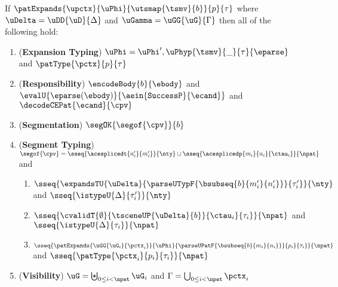 \documentclass[acmsmall]{acmart}
\begin{document}
\begin{theorem}
\label{thm:spTLM-Typing-Segmentation}
If $\patExpands{\upctx}{\uPhi}{\utsmap{\tsmv}{b}}{p}{\tau}$ where $\uDelta=\uDD{\uD}{\Delta}$ and $\uGamma=\uGG{\uG}{\Gamma}$ then all of the following hold:
\begin{enumerate}[nolistsep,leftmargin=10pt,label={\arabic*.}]
        \item (\textbf{Expansion Typing}) $\uPhi=\uPhi', \uPhyp{\tsmv}{\_}{\tau}{\eparse}$ and $\patType{\pctx}{p}{\tau}$
        \item (\textbf{Responsibility}) $\encodeBody{b}{\ebody}$ and $\evalU{\eparse(\ebody)}{\aein{\mathtt{SuccessP}}{\ecand}}$ and $\decodeCEPat{\ecand}{\cpv}$
        \item (\textbf{Segmentation}) $\segOK{\segof{\cpv}}{b}$
        \item (\textbf{Segment Typing}) $\segof{\cpv} = \sseq{\acesplicedt{n'_i}{m'_i}}{\nty} \cup \sseq{\acesplicedp{m_i}{n_i}{\ctau_i}}{\npat}$ and
          \begin{enumerate}
          \item $\sseq{
                \expandsTU{\uDelta}
                {
                  \parseUTypF{\bsubseq{b}{m'_i}{n'_i}}
                }{\tau'_i}
              }{\nty}$ and $\sseq{\istypeU{\Delta}{\tau'_i}}{\nty}$
          \item $\sseq{
            \cvalidT{\emptyset}{
              \tsceneUP
                {\uDelta}{b}
            }{
              \ctau_i
            }{\tau_i}
          }{\npat}$ and $\sseq{\istypeU{\Delta}{\tau_i}}{\npat}$
          \item $\sseq{
            \patExpands
              {\uGG{\uG_i}{\pctx_i}}
              {\uPhi}
              {\parseUPatF{\bsubseq{b}{m_i}{n_i}}}
              {p_i}
              {\tau_i}
          }{\npat}$  and $\sseq{\patType{\pctx_i}{p_i}{\tau_i}}{\npat}$
          \end{enumerate}
      \item (\textbf{Visibility}) $\uG = \biguplus_{0 \leq i < \npat} \uG_i$ and $\Gamma = \bigcup_{0 \leq i < \npat} \pctx_i$
\end{enumerate}
\end{theorem}


\end{document}
